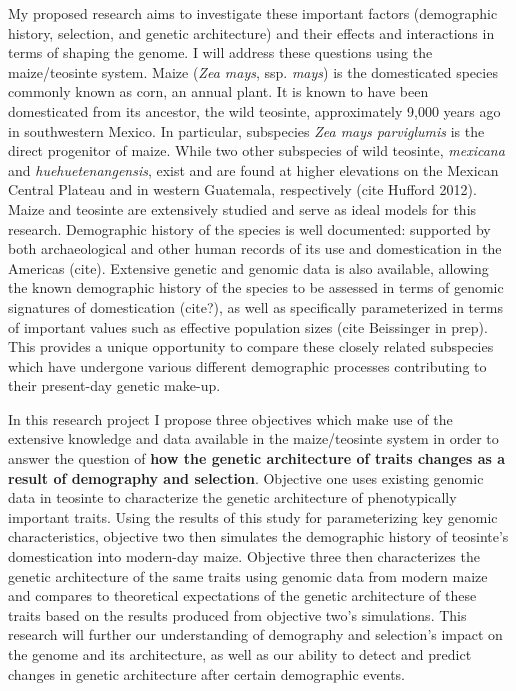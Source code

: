 My proposed research aims to investigate these important factors (demographic history, selection, and genetic architecture) and their effects and interactions in terms of shaping the genome. I will address these questions using the maize/teosinte system. Maize (\emph{Zea mays}, ssp. \emph{mays}) is the domesticated species commonly known as corn, an annual plant. It is known to have been domesticated from its ancestor, the wild teosinte, approximately 9,000 years ago in southwestern Mexico. In particular, subspecies \emph{Zea mays parviglumis} is the direct progenitor of maize. While two other subspecies of wild teosinte, \emph{mexicana} and \emph{huehuetenangensis}, exist and are found at higher elevations on the Mexican Central Plateau and in western Guatemala, respectively (cite Hufford 2012). Maize and teosinte are extensively studied and serve as ideal models for this research. Demographic history of the species is well documented: supported by both archaeological and other human records of its use and domestication in the Americas (cite). Extensive genetic and genomic data is also available, allowing the known demographic history of the species to be assessed in terms of genomic signatures of domestication (cite?), as well as specifically parameterized in terms of important values such as effective population sizes (cite Beissinger in prep). This provides a unique opportunity to compare these closely related subspecies which have undergone various different demographic processes contributing to their present-day genetic make-up.

In this research project I propose three objectives which make use of the extensive knowledge and data available in the maize\//teosinte system in order to answer the question of \textbf{how the genetic architecture of traits changes as a result of demography and selection}. Objective one uses existing genomic data in teosinte to characterize the genetic architecture of phenotypically important traits. Using the results of this study for parameterizing key genomic characteristics, objective two then simulates the demographic history of teosinte's domestication into modern-day maize. Objective three then characterizes the genetic architecture of the same traits using genomic data from modern maize and compares to theoretical expectations of the genetic architecture of these traits based on the results produced from objective two's simulations. This research will further our understanding of demography and selection's impact on the genome and its architecture, as well as our ability to detect and predict changes in genetic architecture after certain demographic events.



